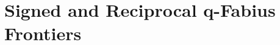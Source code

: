 \documentclass[11pt,oneside]{article}
\numberwithin{equation}{section}
\theoremstyle{definition}
\theoremstyle{remark}
\begin{document}
\newcommand{\Unif}{\operatorname{Unif}}
\newcommand{\floor}[1]{\left\lfloor#1\right\rfloor}
\newcommand{\ceil}[1]{\left\lceil#1\right\rceil}
\newcommand{\pospart}[1]{\left(#1\right)_{+}}
\newcommand{\Br}{\mathfrak B}
\newcommand{\Zpart}{\mathscr Z}
\newcommand{\Gr}{\operatorname{Gr}}
\setcounter{section}{0}
\renewcommand{\thesection}{\arabic{section}}
\part{Signed and Reciprocal q-Fabius Frontiers}
\end{document}
